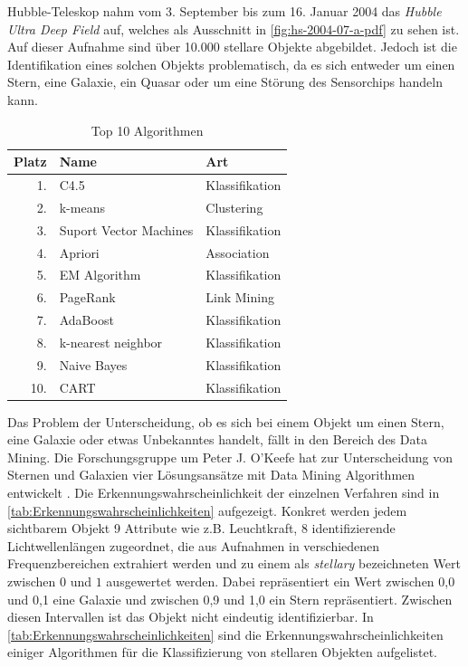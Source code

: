\documentclass[12pt,journal,compsoc,ngerman]{IEEEtran}
\begin{document}
 Hubble-Teleskop nahm vom 3. September bis zum 16. Januar
2004 das \emph{Hubble Ultra Deep Field} auf, welches als Ausschnitt in \cref{fig:hs-2004-07-a-pdf} zu sehen ist. Auf dieser Aufnahme sind über 10.000 stellare Objekte abgebildet. Jedoch ist die Identifikation eines solchen Objekts problematisch, da es sich entweder um einen Stern, eine Galaxie, ein Quasar oder um eine Störung des Sensorchips handeln kann.



\begin{table}[!th]
\centering
\caption{Top 10 Algorithmen \cite{wu2008top}}
\begin{tabular}{r|l|l}
Platz & Name & Art\\ \hline
1.& C4.5 & Klassifikation\\
2.& k-means & Clustering\\
3.& Suport Vector Machines & Klassifikation\\
4.& Apriori & Association\\
5.& EM Algorithm & Klassifikation\\
6.& PageRank & Link Mining\\
7.& AdaBoost & Klassifikation\\
8.& k-nearest neighbor & Klassifikation\\
9.& Naive Bayes & Klassifikation\\
10.& CART & Klassifikation
\end{tabular}
\label{tab:top10}
\end{table}


Das Problem der Unterscheidung, ob es sich bei einem Objekt um einen Stern, eine Galaxie oder etwas Unbekanntes handelt, fällt in den Bereich des Data Mining. Die Forschungsgruppe um Peter J. O'Keefe hat zur Unterscheidung von Sternen und Galaxien vier Lösungsansätze mit Data Mining Algorithmen entwickelt \cite{o2009star}. Die Erkennungswahrscheinlichkeit der einzelnen Verfahren sind in \cref{tab:Erkennungswahrscheinlichkeiten} aufgezeigt. Konkret werden jedem sichtbarem Objekt 9 Attribute wie z.B. Leuchtkraft, 8 identifizierende Lichtwellenlängen zugeordnet, die aus Aufnahmen in verschiedenen Frequenzbereichen extrahiert werden und zu einem als \emph{stellary} bezeichneten Wert zwischen $0$ und $1$ ausgewertet werden. Dabei repräsentiert ein Wert zwischen 0,0 und 0,1 eine Galaxie und zwischen 0,9 und 1,0 ein Stern repräsentiert. Zwischen diesen Intervallen ist das Objekt nicht eindeutig identifizierbar. In \cref{tab:Erkennungswahrscheinlichkeiten} sind die Erkennungswahrscheinlichkeiten einiger Algorithmen für die Klassifizierung von stellaren Objekten aufgelistet.
\end{document}
